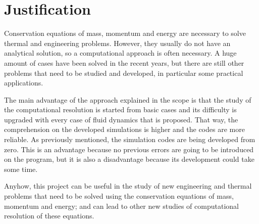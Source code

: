 \section{Justification}
Conservation equations of mass, momentum and energy are necessary to solve thermal and engineering problems. However, they usually do not have an analytical solution, so a computational approach is often necessary. A huge amount of cases have been solved in the recent years, but there are still other problems that need to be studied and developed, in particular some practical applications.

The main advantage of the approach explained in the scope is that the study of the computational resolution is started from basic cases and its difficulty is upgraded with every case of fluid dynamics that is proposed. That way, the comprehension on the developed simulations is higher and the codes are more reliable. As previously mentioned, the simulation codes are being developed from zero. This is an advantage because no previous errors are going to be introduced on the program, but it is also a disadvantage because its development could take some time.

Anyhow, this project can be useful in the study of new engineering and thermal problems that need to be solved using the conservation equations of mass, momentum and energy; and can lead to other new studies of computational resolution of these equations.

